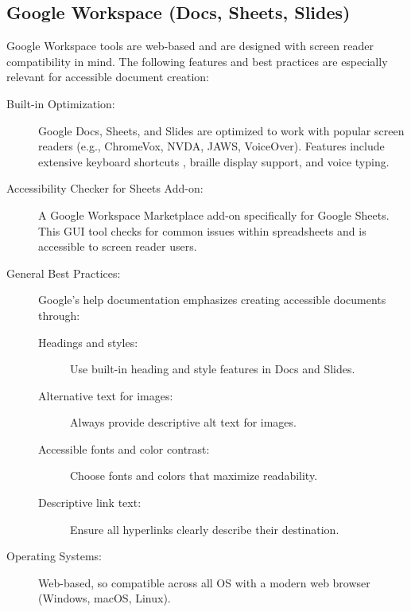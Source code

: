 \subsection{Google Workspace (Docs, Sheets, Slides)}
\label{subsec:googleworkspace-accessibility}
Google Workspace tools are web-based and are designed with screen reader compatibility in mind. The following features and best practices are especially relevant for accessible document creation:
\begin{description}
    \item[Built-in Optimization:] Google Docs, Sheets, and Slides are optimized to work with popular screen readers (e.g., ChromeVox, NVDA, JAWS, VoiceOver). Features include extensive keyboard shortcuts \cite{GoogleShortcuts}, braille display support, and voice typing.
    \item[Accessibility Checker for Sheets Add-on:] \cite{SheetsChecker} A Google Workspace Marketplace add-on specifically for Google Sheets. This GUI tool checks for common issues within spreadsheets and is accessible to screen reader users.
    \item[General Best Practices:] Google's help documentation emphasizes creating accessible documents through:
    \begin{description}
        \item[Headings and styles:] Use built-in heading and style features in Docs and Slides.
        \item[Alternative text for images:] \cite{GoogleAltText} Always provide descriptive alt text for images.
        \item[Accessible fonts and color contrast:] Choose fonts and colors that maximize readability.
        \item[Descriptive link text:] Ensure all hyperlinks clearly describe their destination.
    \end{description}
    \item[Operating Systems:] Web-based, so compatible across all OS with a modern web browser (Windows, macOS, Linux).
\end{description}

